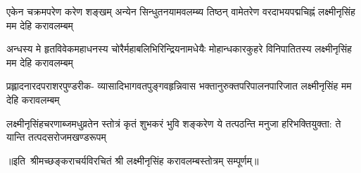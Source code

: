 \fourlineindentedshloka
{एकेन चक्रमपरेण करेण शङ्खम्}
{अन्येन सिन्धुतनयामवलम्ब्य तिष्ठन्}
{वामेतरेण वरदाभयपद्मचिह्नं}
{लक्ष्मीनृसिंह मम देहि करावलम्बम्} 

\fourlineindentedshloka
{अन्धस्य मे हृतविवेकमहाधनस्य}
{चोरैर्महाबलिभिरिन्द्रियनामधेयैः}
{मोहान्धकारकुहरे विनिपातितस्य}
{लक्ष्मीनृसिंह मम देहि करावलम्बम्} 

\fourlineindentedshloka
{प्रह्लादनारदपराशरपुण्डरीक-}
{व्यासादिभागवतपुङ्गवहृन्निवास}
{भक्तानुरुक्तपरिपालनपारिजात}
{लक्ष्मीनृसिंह मम देहि करावलम्बम्} 

\fourlineindentedshloka
{लक्ष्मीनृसिंहचरणाब्जमधुव्रतेन}
{स्तोत्रं कृतं शुभकरं भुवि शङ्करेण}
{ये तत्पठन्ति मनुजा हरिभक्तियुक्ता:}
{ते यान्ति तत्पदसरोजमखण्डरूपम्} 
       
॥इति~श्रीमच्छङ्कराचर्यविरचितं श्री लक्ष्मीनृसिंह करावलम्बस्तोत्रम् सम्पूर्णम्‌॥ 